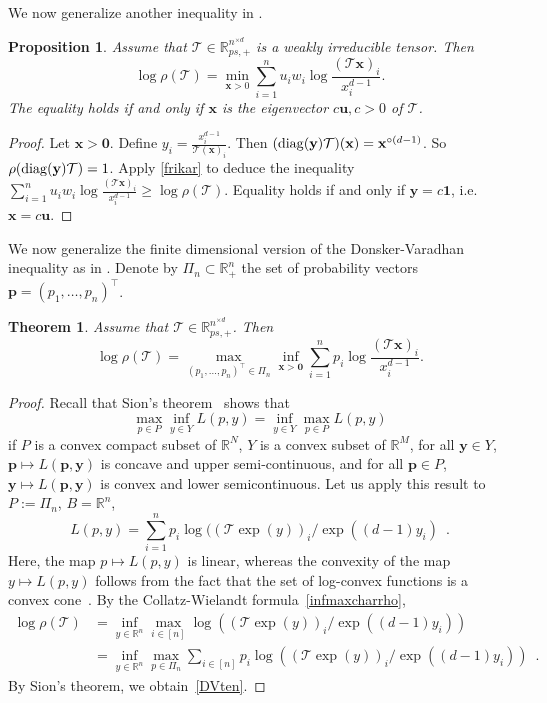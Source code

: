 \documentclass{amsart}
\newcommand{\diag}{\operatorname{diag}}
\newcommand{\R}{\mathbb{R}}
\newcommand{\p}{\mathbf{p}}
\newcommand{\uu}{\mathbf{u}}
\newcommand{\x}{\mathbf{x}}
\newcommand{\y}{\mathbf{y}}
\newcommand{\0}{\mathbf{0}}
\newcommand{\1}{\mathbf{1}}
\newcommand{\cT}{\mathcal{T}}
\def\diag{\mathop{{\rm diag}}\nolimits}
\newcommand{\trans}{^\top}
\newtheorem{theorem}[theo]{Theorem}
\newtheorem{proposition}[theo]{Proposition}
\theoremstyle{remark}
\numberwithin{equation}{section} %
\renewcommand{\ge}{\geqslant}
\begin{document}
 We now generalize another inequality in \cite[Theorem 3.1]{FK75}.
 \begin{proposition}\label{corFKtens}  
Assume that $\cT\in \R_{ps,+}^{n^{\times d}}$ is a weakly irreducible tensor.
%
Then
 \begin{equation}\label{minrhoTchar}
 \log \rho(\cT)=\min_{\x>0} \sum_{i=1}^n u_iw_i \log \frac{(\cT\x)_i}{x_i^{d-1}}.
 \end{equation}
The equality holds if and only if $\x$ is the eigenvector $c\uu, c>0$ of $\cT$.
 \end{proposition} 
 \begin{proof}  Let $\x>\0$.  Define $y_i=\frac{x_i^{d-1}}{\cT(\x)_i}$.
 Then $(\diag(\y)\cT)(\x)=\x^{\circ(d-1)}$.  So $\rho(\diag(\y)\cT)=1$.  Apply \eqref{frikar} to deduce the inequality
 $ \sum_{i=1}^n u_iw_i \log \frac{(\cT\x)_i}{x_i^{d-1}}\ge\log \rho(\cT)$.  Equality holds if and only if $\y=c\1$, i.e.\
 $\x=c\uu$.  \end{proof}

 We now generalize the finite dimensional version of the Donsker-Varadhan inequality \cite{DV75} as in \cite{Fri81}.  Denote by $\Pi_n\subset \R_+^n$ the set of probability vectors $\p=(p_1,\ldots,p_n)\trans$.
 \begin{theorem}\label{DVtens}
Assume that $\cT\in \R_{ps,+}^{n^{\times d}}$.
Then
 \begin{equation}\label{DVten}
 \log\rho(\cT)=\max_{(p_1,\ldots,p_n)\trans\in \Pi_n}\inf_{\x>\0}\sum_{i=1}^n p_i  \log\frac{(\cT\x)_i}{x_i^{d-1}}.
 \end{equation}
 \end{theorem}
\begin{proof}
Recall that Sion's theorem~\cite{sion} shows that
\[\max_{p\in P}\inf_{y\in Y}L(p,y)=\inf_{y\in Y}\max_{p\in P}L(p,y)
\]
if $P$ is a convex compact subset of $\R^N$, $Y$ is a convex subset of $\R^M$,
for all $\y\in Y$, $\p\mapsto L(\p,\y)$ is concave and upper semi-continuous, and for all $\p\in P$, $\y\mapsto L(\p,\y)$ is convex and lower semicontinuous.
Let us apply this result to $P:=\Pi_n$, $B=\R^n$, 
\[ L(p,y) = \sum_{i=1}^n p_i \log((\cT\exp(y))_i/\exp((d-1)y_i)
\enspace . 
\]
Here, the map $p\mapsto L(p,y)$ is linear, whereas
the convexity of the map $y\mapsto L(p,y)$ follows from the
fact that the set of log-convex functions is a convex cone~\cite{Kin61}.
By the Collatz-Wielandt formula~\eqref{infmaxcharrho}, 
\begin{eqnarray}
\log \rho(\cT)&=
\inf_{y\in\R^n}\max_{i\in[n]}\log((\cT\exp(y))_i/\exp((d-1)y_i))\nonumber
\\
&= \inf_{y\in\R^n}\max_{p\in\Pi_n}\sum_{i\in [n]}p_i\log((\cT\exp(y))_i/\exp((d-1)y_i)) \enspace.
\nonumber
\end{eqnarray}
By Sion's theorem, we obtain~\eqref{DVten}.
\end{proof}
%
 
\end{document}
